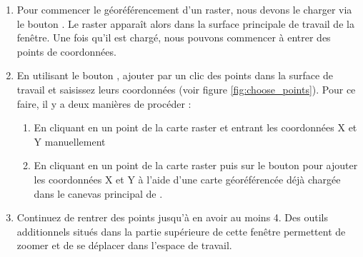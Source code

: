 \begin{enumerate}
\item Pour commencer le géoréférencement d'un raster, nous devons le charger via le bouton \browsebutton. Le raster apparaît alors dans la surface principale de travail de la fenêtre. Une fois qu'il est chargé, nous pouvons commencer à entrer des points de coordonnées.

\item En utilisant le bouton , ajouter par un clic des points dans la surface de travail et saisissez leurs coordonnées (voir figure \ref{fig:choose_points}). Pour ce faire, il y a deux manières de procéder :

\begin{enumerate}
\item En cliquant en un point de la carte raster et entrant les coordonnées X et Y manuellement
\item En cliquant en un point de la carte raster puis sur le bouton  pour ajouter les coordonnées X et Y à l'aide d'une carte géoréférencée déjà chargée dans le canevas principal de \qg.
\end{enumerate}
\item Continuez de rentrer des points jusqu'à en avoir au moins 4. Des outils additionnels situés dans la partie supérieure de cette fenêtre permettent de zoomer et de se déplacer dans l'espace de travail.
\end{enumerate}

